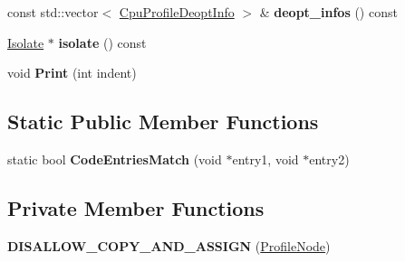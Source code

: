 \begin{DoxyCompactItemize}
\item 
const std\+::vector$<$ \hyperlink{structv8_1_1_cpu_profile_deopt_info}{Cpu\+Profile\+Deopt\+Info} $>$ \& {\bfseries deopt\+\_\+infos} () const \hypertarget{classv8_1_1internal_1_1_profile_node_a7997bf12869e0337e31eb42a2695b57b}{}\label{classv8_1_1internal_1_1_profile_node_a7997bf12869e0337e31eb42a2695b57b}

\item 
\hyperlink{classv8_1_1internal_1_1_isolate}{Isolate} $\ast$ {\bfseries isolate} () const \hypertarget{classv8_1_1internal_1_1_profile_node_af6bdbf5275f5c7e17fafa45b531d8906}{}\label{classv8_1_1internal_1_1_profile_node_af6bdbf5275f5c7e17fafa45b531d8906}

\item 
void {\bfseries Print} (int indent)\hypertarget{classv8_1_1internal_1_1_profile_node_a197b95750e6a2103f6b2f87128b84b39}{}\label{classv8_1_1internal_1_1_profile_node_a197b95750e6a2103f6b2f87128b84b39}

\end{DoxyCompactItemize}
\subsection*{Static Public Member Functions}
\begin{DoxyCompactItemize}
\item 
static bool {\bfseries Code\+Entries\+Match} (void $\ast$entry1, void $\ast$entry2)\hypertarget{classv8_1_1internal_1_1_profile_node_a07c1b149ad3da926f361abfc9b530736}{}\label{classv8_1_1internal_1_1_profile_node_a07c1b149ad3da926f361abfc9b530736}

\end{DoxyCompactItemize}
\subsection*{Private Member Functions}
\begin{DoxyCompactItemize}
\item 
{\bfseries D\+I\+S\+A\+L\+L\+O\+W\+\_\+\+C\+O\+P\+Y\+\_\+\+A\+N\+D\+\_\+\+A\+S\+S\+I\+GN} (\hyperlink{classv8_1_1internal_1_1_profile_node}{Profile\+Node})\hypertarget{classv8_1_1internal_1_1_profile_node_a933270c04bab0f2c5cc954d1a30752a0}{}\label{classv8_1_1internal_1_1_profile_node_a933270c04bab0f2c5cc954d1a30752a0}

\end{DoxyCompactItemize}
